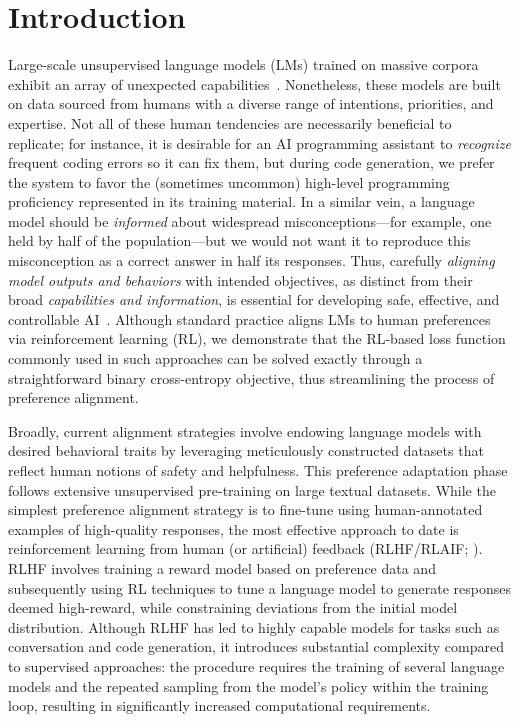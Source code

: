 \section{Introduction}
Large-scale unsupervised language models (LMs) trained on massive corpora exhibit an array of unexpected capabilities~\citep{chowdhery2022palm, brown2020language, touvron2023llama, bubeck2023sparks}. Nonetheless, these models are built on data sourced from humans with a diverse range of intentions, priorities, and expertise. Not all of these human tendencies are necessarily beneficial to replicate; for instance, it is desirable for an AI programming assistant to \textit{recognize} frequent coding errors so it can fix them, but during code generation, we prefer the system to favor the (sometimes uncommon) high-level programming proficiency represented in its training material. In a similar vein, a language model should be \textit{informed} about widespread misconceptions—for example, one held by half of the population—but we would not want it to reproduce this misconception as a correct answer in half its responses. Thus, carefully \emph{aligning model outputs and behaviors} with intended objectives, as distinct from their broad \textit{capabilities and information}, is essential for developing safe, effective, and controllable AI~\citep{ouyang2022training}. Although standard practice aligns LMs to human preferences via reinforcement learning (RL), we demonstrate that the RL-based loss function commonly used in such approaches can be solved exactly through a straightforward binary cross-entropy objective, thus streamlining the process of preference alignment.

Broadly, current alignment strategies involve endowing language models with desired behavioral traits by leveraging meticulously constructed datasets that reflect human notions of safety and helpfulness. This preference adaptation phase follows extensive unsupervised pre-training on large textual datasets. While the simplest preference alignment strategy is to fine-tune using human-annotated examples of high-quality responses, the most effective approach to date is reinforcement learning from human (or artificial) feedback (RLHF/RLAIF; \citep{christiano2017deep, bai2022constitutional}). RLHF involves training a reward model based on preference data and subsequently using RL techniques to tune a language model to generate responses deemed high-reward, while constraining deviations from the initial model distribution. Although RLHF has led to highly capable models for tasks such as conversation and code generation, it introduces substantial complexity compared to supervised approaches: the procedure requires the training of several language models and the repeated sampling from the model’s policy within the training loop, resulting in significantly increased computational requirements.

